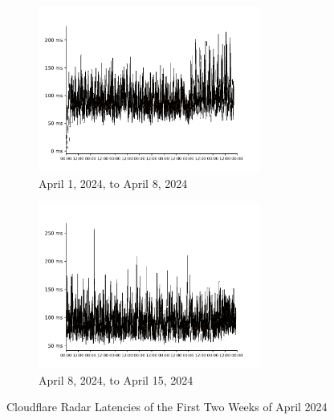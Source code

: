 \begin{figure}
	\centering
	\begin{subfigure}[b]{\textwidth}
		\centering
		\includegraphics[width=0.8\textwidth]{chapters/4-results/latency/img/cf_radar_latencies_2024-04-01_2024-04-08.pdf}
		\caption{April 1, 2024, to April 8, 2024}
	\end{subfigure}
	\begin{subfigure}[b]{\textwidth}
		\centering
		\includegraphics[width=0.8\textwidth]{chapters/4-results/latency/img/cf_radar_latencies_2024-04-08_2024-04-15.pdf}
		\caption{April 8, 2024, to April 15, 2024}
	\end{subfigure}
	\caption{Cloudflare Radar Latencies of the First Two Weeks of April 2024}
	\label{fig:latency-per-weekday-weeks-1}
\end{figure}

